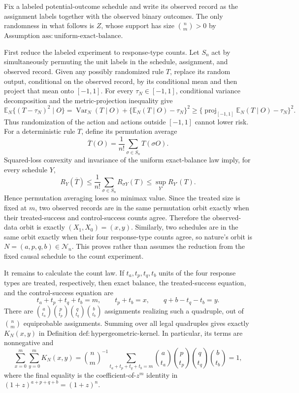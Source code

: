 Fix a labeled potential-outcome schedule and write its observed record as the assignment labels together with the observed binary outcomes.  The only randomness in what follows is \(Z\), whose support has size \(\binom n m>0\) by Assumption \(\mathrm{ass{:}uniform\mbox{-}exact\mbox{-}balance}\).

First reduce the labeled experiment to response-type counts.  Let \(S_n\) act by simultaneously permuting the unit labels in the schedule, assignment, and observed record.  Given any possibly randomized rule \(T\), replace its random output, conditional on the observed record, by its conditional mean and then project that mean onto \([-1,1]\).  For every \(\tau_N\in[-1,1]\), conditional variance decomposition and the metric-projection inequality give
\[
 \mathbb E_N\{(T-\tau_N)^2\mid O\}
 =\operatorname{Var}_N(T\mid O)+\{\mathbb E_N(T\mid O)-\tau_N\}^2
 \geq \{\operatorname{proj}_{[-1,1]}\mathbb E_N(T\mid O)-\tau_N\}^2.
\]
Thus randomization of the action and actions outside \([-1,1]\) cannot lower risk.  For a deterministic rule \(T\), define its permutation average
\[
 \overline T(O)=\frac1{n!}\sum_{\sigma\in S_n}T(\sigma O).
\]
Squared-loss convexity and invariance of the uniform exact-balance law imply, for every schedule \(Y\),
\[
 R_Y(\overline T)
 \leq \frac1{n!}\sum_{\sigma\in S_n}R_{\sigma Y}(T)
 \leq \sup_{Y'}R_{Y'}(T).
\]
Hence permutation averaging loses no minimax value.  Since the treated size is fixed at \(m\), two observed records are in the same permutation orbit exactly when their treated-success and control-success counts agree.  Therefore the observed-data orbit is exactly \((X_1,X_0)=(x,y)\).  Similarly, two schedules are in the same orbit exactly when their four response-type counts agree, so nature's orbit is \(N=(a,p,q,b)\in\mathcal N_n\).  This proves rather than assumes the reduction from the fixed causal schedule to the count experiment.

It remains to calculate the count law.  If \(t_a,t_p,t_q,t_b\) units of the four response types are treated, respectively, then exact balance, the treated-success equation, and the control-success equation are
\[
 t_a+t_p+t_q+t_b=m,\qquad t_p+t_b=x,\qquad q+b-t_q-t_b=y.
\]
There are
\(
 \binom a{t_a}\binom p{t_p}\binom q{t_q}\binom b{t_b}
\)
assignments realizing such a quadruple, out of \(\binom n m\) equiprobable assignments.  Summing over all legal quadruples gives exactly \(K_N(x,y)\) in Definition \(\mathrm{def{:}hypergeometric\mbox{-}kernel}\).  In particular, its terms are nonnegative and
\[
 \sum_{x=0}^m\sum_{y=0}^mK_N(x,y)
 =\binom n m^{-1}\sum_{t_a+t_p+t_q+t_b=m}
   \binom a{t_a}\binom p{t_p}\binom q{t_q}\binom b{t_b}=1,
\]
where the final equality is the coefficient-of-\(z^m\) identity in
\((1+z)^{a+p+q+b}=(1+z)^n\).


